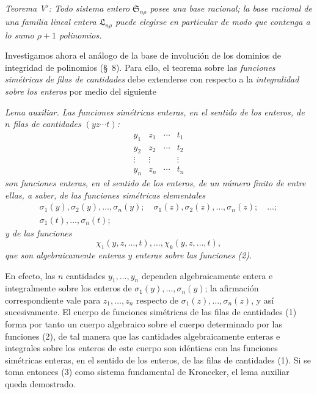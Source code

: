 \documentclass[11pt]{article}
\providecommand{\Ssys}{\mathfrak{S}}
\providecommand{\Lsys}{\mathfrak{L}}
\begin{document}
\emph{Teorema V$'$: Todo sistema entero $\Ssys_{n\rho}$ posee una base racional; la base racional de una familia lineal entera $\Lsys_{n\rho}$ puede elegirse en particular de modo que contenga a lo sumo $\rho+1$ polinomios.}

Investigamos ahora el análogo de la base de involución de los dominios de integridad de polinomios (\S\ 8). Para ello, el teorema sobre las \emph{funciones simétricas de filas de cantidades} debe extenderse con respecto a la \emph{integralidad sobre los enteros} por medio del siguiente

\emph{Lema auxiliar. Las funciones simétricas enteras, en el sentido de los enteros, de $n$ filas de cantidades $(yz\cdots t)$:}
\begin{equation}
\begin{array}{cccc}
  y_1&z_1&\cdots&t_1\\
  y_2&z_2&\cdots&t_2\\
  \vdots&\vdots&&\vdots\\
  y_n&z_n&\cdots&t_n
\end{array}
\tag{1}
\end{equation}
\emph{son funciones enteras, en el sentido de los enteros, de un número finito de entre ellas, a saber, de las funciones simétricas elementales}
\begin{equation}
\begin{gathered}
  \sigma_1(y),\sigma_2(y),\ldots,\sigma_n(y);\quad
  \sigma_1(z),\sigma_2(z),\ldots,\sigma_n(z);\quad\ldots;\\
  \sigma_1(t),\ldots,\sigma_n(t);
\end{gathered}
\tag{2}
\end{equation}
\emph{y de las funciones}
\begin{equation}
  \chi_1(y,z,\ldots,t),\ldots,\chi_k(y,z,\ldots,t),
\tag{3}
\end{equation}
\emph{que son algebraicamente enteras y enteras sobre las funciones (2).}

En efecto, las $n$ cantidades $y_1,\ldots,y_n$ dependen algebraicamente entera e integralmente sobre los enteros de $\sigma_1(y),\ldots,\sigma_n(y)$; la afirmación correspondiente vale para $z_1,\ldots,z_n$ respecto de $\sigma_1(z),\ldots,\sigma_n(z)$, y así sucesivamente. El cuerpo de funciones simétricas de las filas de cantidades (1) forma por tanto un cuerpo algebraico sobre el cuerpo determinado por las funciones (2), de tal manera que las cantidades algebraicamente enteras e integrales sobre los enteros de este cuerpo son idénticas con las funciones simétricas enteras, en el sentido de los enteros, de las filas de cantidades (1). Si se toma entonces (3) como sistema fundamental de Kronecker, el lema auxiliar queda demostrado.
\end{document}

